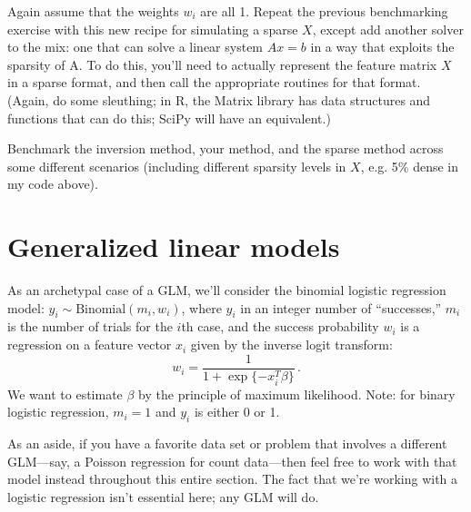 \documentclass{article}
\begin{document}
\begin{enumerate}[label=(\Alph*)]
Again assume that the weights $w_i$ are all 1.  Repeat the previous benchmarking exercise with this new recipe for simulating a sparse $X$, except add another solver to the mix: one that can solve a linear system $Ax = b$ in a way that exploits the sparsity of A.  To do this, you'll need to actually represent the feature matrix $X$ in a sparse format, and then call the appropriate routines  for that format.  (Again, do some sleuthing; in R, the Matrix library has data structures and functions that can do this; SciPy will have an equivalent.)

Benchmark the inversion method, your method, and the sparse method across some different scenarios (including different sparsity levels in $X$, e.g. 5\% dense in my code above).
\end{enumerate}


\section{Generalized linear models}

As an archetypal case of a GLM, we'll consider the binomial logistic regression model: $y_i \sim \mbox{Binomial}(m_i, w_i)$, where $y_i$ in an integer number of ``successes,'' $m_i$ is the number of trials for the $i$th case, and the success probability $w_i$ is a regression on a feature vector $x_i$ given by the inverse logit transform:
$$
w_i = \frac{1}{1 + \exp\{-x_i^T \beta\}} \, .
$$
We want to estimate $\beta$ by the principle of maximum likelihood.  Note: for binary logistic regression, $m_i = 1$ and $y_i$ is either 0 or 1.

As an aside, if you have a favorite data set or problem that involves a different GLM---say, a Poisson regression for count data---then feel free to work with that model instead throughout this entire section.  The fact that we're working with a logistic regression isn't essential here; any GLM will do.
\end{document}
